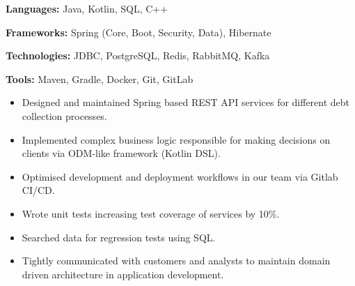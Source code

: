 \documentclass[12pt,a4paper,ragged2e,withhyper]{altacv}
\begin{document}

\medskip


\personalinfo{
  \location{Ida-Virumaa, Estonia}
  \email{adp3171@gmail.com}
  \linkedin{no-reason-why-not}
  \github{github.com/leeeqo}
} 

\makecvheader

\medskip

\textbf{Languages:} Java, Kotlin, SQL, C++
\smallskip

\textbf{Frameworks:} Spring (Core, Boot, Security, Data), Hibernate
\smallskip

\textbf{Technologies:} JDBC, PostgreSQL, Redis, RabbitMQ, Kafka
\smallskip

\textbf{Tools:} Maven, Gradle, Docker, Git, GitLab

\medskip


\begin{itemize}
    \item Designed and maintained Spring based REST API services for different debt collection processes.
    \item Implemented complex business logic responsible for making decisions on clients via ODM-like framework (Kotlin DSL).
    \item Optimised development and deployment workflows in our team via Gitlab CI/CD.
    \item Wrote unit tests increasing test coverage of services by 10\%.
    \item Searched data for regression tests using SQL.
    \item Tightly communicated with customers and analysts to maintain domain driven architecture in application development.
\end{itemize}
\end{document}
